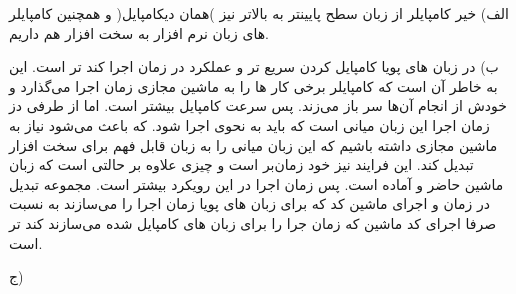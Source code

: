


الف) خیر کامپایلر از زبان سطح پایینتر به بالاتر نیز )همان دیکامپایل( و همچنین کامپایلر های زبان نرم افزار به سخت افزار هم داریم.

ب) در زبان های پویا کامپایل کردن سریع تر و عملکرد در زمان اجرا کند تر است. \newline
این به خاطر آن است که کامپایلر برخی کار ها را به ماشین مجازی زمان اجرا می‌گذارد و خودش از انجام آن‌ها سر باز می‌زند. پس سرعت کامپایل بیشتر است. اما از طرفی دز زمان اجرا این زبان میانی است که باید به نحوی اجرا شود. که باعث می‌شود نیاز به ماشین مجازی داشته باشیم که این زبان میانی را به زبان قابل فهم برای سخت افزار تبدیل کند. این فرایند نیز خود زمان‌بر است و چیزی علاوه بر حالتی است که زبان ماشین حاضر و آماده است. پس زمان اجرا در این رویکرد بیشتر است. مجموعه تبدیل در زمان و اجرای ماشین کد که برای زبان های پویا زمان اجرا را می‌سازند به نسبت صرفا اجرای کد ماشین که زمان جرا را برای زبان های کامپایل شده می‌سازند کند تر است.  \newline

ج) 

\begin{latin}
\end{latin}
